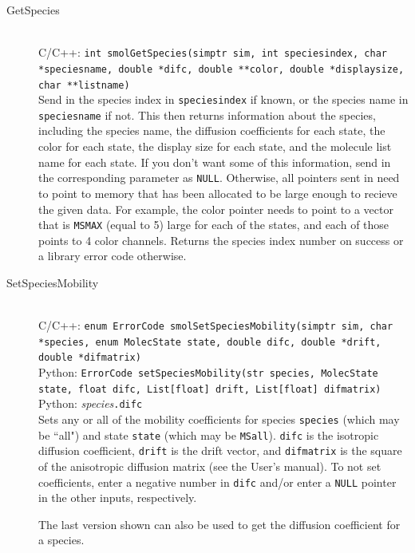 \documentclass {scrbook}
\newcommand {\ttt} {\texttt}
\begin{document}
\begin{description}
\item[GetSpecies]
\hfill \\
C/C++: \ttt{int smolGetSpecies(simptr sim, int speciesindex, char *speciesname, double *difc, double **color, double *displaysize, char **listname)}\\
Send in the species index in \ttt{speciesindex} if known, or the species name in \ttt{speciesname} if not. This then returns information about the species, including the species name, the diffusion coefficients for each state, the color for each state, the display size for each state, and the molecule list name for each state. If you don't want some of this information, send in the corresponding parameter as \ttt{NULL}. Otherwise, all pointers sent in need to point to memory that has been allocated to be large enough to recieve the given data. For example, the color pointer needs to point to a vector that is \ttt{MSMAX} (equal to 5) large for each of the states, and each of those points to 4 color channels. Returns the species index number on success or a library error code otherwise.

\item[SetSpeciesMobility]
\hfill \\
C/C++: \ttt{enum ErrorCode smolSetSpeciesMobility(simptr sim, char *species, enum MolecState state, double difc, double *drift, double *difmatrix)}\\
Python: \ttt{ErrorCode setSpeciesMobility(str species, MolecState state, float difc, List[float] drift, List[float] difmatrix)}\\
Python: \textit{species}\ttt{.difc}\\
Sets any or all of the mobility coefficients for species \ttt{species} (which may be ``all") and state \ttt{state} (which may be \ttt{MSall}). \ttt{difc} is the isotropic diffusion coefficient, \ttt{drift} is the drift vector, and \ttt{difmatrix} is the square of the anisotropic diffusion matrix (see the User's manual). To not set coefficients, enter a negative number in \ttt{difc} and/or enter a \ttt{NULL} pointer in the other inputs, respectively.

The last version shown can also be used to get the diffusion coefficient for a species.


\end{description}
\end{document}
